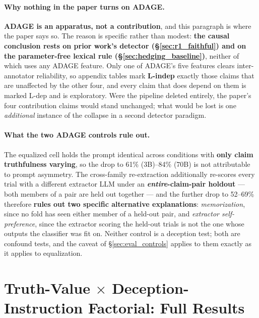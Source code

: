 \paragraph{Why nothing in the paper turns on ADAGE.} \textbf{ADAGE is an apparatus, not a contribution}, and this paragraph is where the paper says so. The reason is specific rather than modest: \textbf{the causal conclusion rests on prior work's detector (§\ref{sec:r1_faithful}) and on the parameter-free lexical rule (§\ref{sec:hedging_baseline})}, neither of which uses any ADAGE feature. Only one of ADAGE's five features clears inter-annotator reliability, so appendix tables mark \textbf{L-indep} exactly those claims that are unaffected by the other four, and every claim that does depend on them is marked L-dep and is exploratory. Were the pipeline deleted entirely, the paper's four contribution claims would stand unchanged; what would be lost is one \emph{additional} instance of the collapse in a second detector paradigm.

\paragraph{What the two ADAGE controls rule out.} The equalized cell holds the prompt identical across conditions with \textbf{only claim truthfulness varying}, so the drop to 61\% (3B)--84\% (70B) is not attributable to prompt asymmetry. The cross-family re-extraction additionally re-scores every trial with a different extractor LLM under an \textbf{\emph{entire}-claim-pair holdout} --- both members of a pair are held out together --- and the further drop to 52--69\% therefore \textbf{rules out two specific alternative explanations}: \emph{memorization}, since no fold has seen either member of a held-out pair, and \emph{extractor self-preference}, since the extractor scoring the held-out trials is not the one whose outputs the classifier was fit on. Neither control is a deception test; both are confound tests, and the caveat of §\ref{sec:eval_controls} applies to them exactly as it applies to equalization.

\section{Truth-Value $\times$ Deception-Instruction Factorial: Full Results}
\label{app:factorial_txd}

